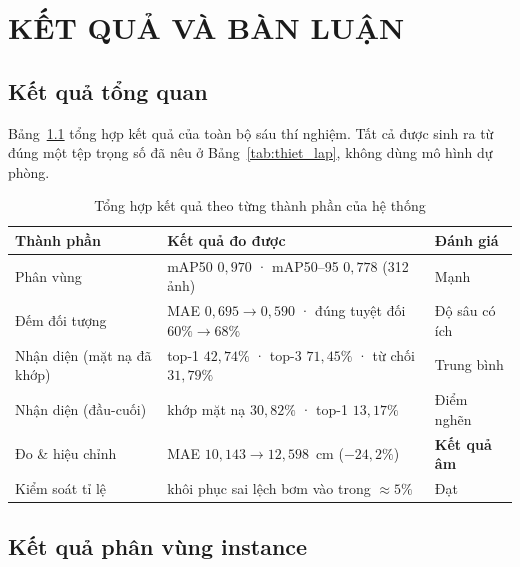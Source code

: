 \chapter{KẾT QUẢ VÀ BÀN LUẬN}
\label{ch:ket_qua}

\section{Kết quả tổng quan}

Bảng~\ref{tab:tong_quan} tổng hợp kết quả của toàn bộ sáu thí nghiệm. Tất cả được sinh ra từ
đúng một tệp trọng số đã nêu ở Bảng~\ref{tab:thiet_lap}, không dùng mô hình dự phòng.

\begin{table}[H]
\centering
\caption{Tổng hợp kết quả theo từng thành phần của hệ thống}
\label{tab:tong_quan}
\small
\begin{tabularx}{\textwidth}{l X l}
\toprule
\textbf{Thành phần} & \textbf{Kết quả đo được} & \textbf{Đánh giá} \\
\midrule
Phân vùng
  & mAP50 $0{,}970$ · mAP50--95 $0{,}778$ (312 ảnh)
  & Mạnh \\
Đếm đối tượng
  & MAE $0{,}695 \rightarrow 0{,}590$ · đúng tuyệt đối $60\% \rightarrow 68\%$
  & Độ sâu có ích \\
Nhận diện (mặt nạ đã khớp)
  & top-1 $42{,}74\%$ · top-3 $71{,}45\%$ · từ chối $31{,}79\%$
  & Trung bình \\
Nhận diện (đầu-cuối)
  & khớp mặt nạ $30{,}82\%$ · top-1 $13{,}17\%$
  & Điểm nghẽn \\
Đo \& hiệu chỉnh
  & MAE $10{,}143 \rightarrow 12{,}598$~cm ($-24{,}2\%$)
  & \textbf{Kết quả âm} \\
Kiểm soát tỉ lệ
  & khôi phục sai lệch bơm vào trong $\approx 5\%$
  & Đạt \\
\bottomrule
\end{tabularx}
\end{table}


\section{Kết quả phân vùng instance}

